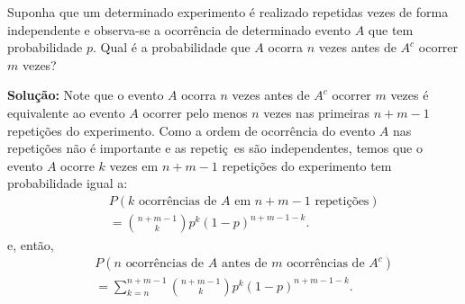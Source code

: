 %
%
%

\begin{frame}
\begin{exem}
Suponha que um determinado experimento é realizado repetidas vezes de forma independente e observa-se a ocorrência de determinado evento $A$ que tem probabilidade $p$. Qual é a probabilidade que $A$ ocorra $n$ vezes antes de $A^c$ ocorrer $m$ vezes?
\end{exem}

{\bf Solução:} Note que o evento $A$ ocorra $n$ vezes antes de $A^c$ ocorrer $m$ vezes é equivalente ao evento $A$ ocorrer pelo menos $n$ vezes nas primeiras $n+m-1$ repetições do experimento. Como a ordem de ocorrência do evento $A$ nas repetições não é importante e as repetiç~es são independentes, temos que o evento $A$ ocorre $k$ vezes em $n+m-1$ repetições do experimento tem probabilidade igual a:
\begin{eqnarray}
& & P(\mbox{$k$ ocorrências de $A$ em $n+m-1$ repetições}) \nonumber \\
& & =\binom{n+m-1}{k}p^k(1-p)^{n+m-1-k}. \nonumber
\end{eqnarray}
e, então,
\begin{eqnarray}
& & P(\mbox{$n$ ocorrências de $A$ antes de $m$ ocorrências de $A^c$})\nonumber \\
& & =\sum_{k=n}^{n+m-1}\binom{n+m-1}{k}p^k(1-p)^{n+m-1-k}.\nonumber
\end{eqnarray}
\end{frame}


